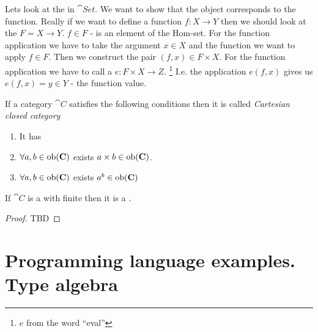 \begin{example}
\label{ex:exponential_set}
Lets look at the  in $\cat{Set}$. We want
to show that the object corresponds to the function. Really if we want
to define a function $f: X \to Y$ then we should look at the
 $F = X \to Y$. $f \in F$ - is an element of the
Hom-set. For the function application we have to take the argument $x
\in X$ and the function we want to apply $f \in F$. Then we construct
the pair $(f,x) \in F \times X$. For the function application we have
to call a  $e: F \times X \to Z$.
\footnote{$e$ from the word ``eval''}
I.e. the
application $e(f, x)$ gives us $e(f, x) = y \in Y$ - the function
value. 
\end{example}

\begin{definition}
\label{def:cartesian_closed_category}
If a category $\cat{C}$ satisfies the following conditions then it is
called \textit{Cartesian closed category}
\begin{enumerate}
\item It has 
\item $\forall a,b \in \mathrm{ob}(\mathbf{C})$ exists  $a
  \times b \in \mathrm{ob}(\mathbf{C})$.
\item $\forall a,b \in \mathrm{ob}(\mathbf{C})$ exists 
  $a^b \in \mathrm{ob}(\mathbf{C})$
\end{enumerate}
\end{definition}

\begin{theorem}
\label{thm:ccc}
If $\cat{C}$ is a  with
finite  then it is a
.
\begin{proof}
TBD
\end{proof}
\end{theorem}

\section{Programming language examples. Type algebra}

